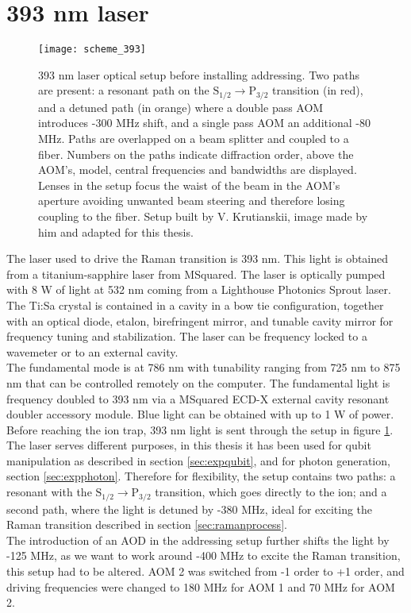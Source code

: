 \section{393 nm laser}
\label{sec:393setup}
\begin{figure}[!ht]
\centering
\texttt{[image: scheme\_393]}
\caption{393 nm laser optical setup before installing addressing. Two paths are present: a resonant path on the $\text{S}_{1/2} \to \text{P}_{3/2}$ transition (in red), and a detuned path (in orange) where a double pass AOM introduces -300 MHz shift, and a single pass AOM an additional -80 MHz. Paths are overlapped on a beam splitter and coupled to a fiber. Numbers on the paths indicate diffraction order, above the AOM's, model, central frequencies and bandwidths are displayed. Lenses in the setup focus the waist of the beam in the AOM's aperture avoiding unwanted beam steering and therefore losing coupling to the fiber. Setup built by V. Krutianskii, image made by him and adapted for this thesis.
}
\label{scheme393}
\end{figure}
The laser used to drive the Raman transition is 393 nm. This light is obtained from a titanium-sapphire laser from MSquared. The laser is optically pumped with 8 W of light at 532 nm coming from a Lighthouse Photonics Sprout laser. The Ti:Sa crystal is contained in a cavity in a bow tie configuration, together with an optical diode, etalon, birefringent mirror, and tunable cavity mirror for frequency tuning and stabilization. The laser can be frequency locked to a wavemeter or to an external cavity.\\ The fundamental mode is at 786 nm with tunability ranging from 725 nm to 875 nm that can be controlled remotely on the computer. The fundamental light is frequency doubled to 393 nm via a MSquared ECD-X external cavity resonant doubler accessory module. Blue light can be obtained with up to 1 W of power. Before reaching the ion trap, 393 nm light is sent through the setup in figure \ref{scheme393}. The laser serves different purposes, in this thesis it has been used for qubit manipulation as described in section \ref{sec:expqubit}, and for photon generation, section \ref{sec:expphoton}. Therefore for flexibility, the setup contains two paths: a resonant with the $\text{S}_{1/2} \to \text{P}_{3/2}$ transition, which goes directly to the ion; and a second path, where the light is detuned by -380 MHz, ideal for exciting the Raman transition described in section \ref{sec:ramanprocess}.\\
The introduction of an AOD in the addressing setup further shifts the light by -125 MHz, as we want to work around -400 MHz to excite the Raman transition,
this setup had to be altered. AOM 2 was switched from -1 order to +1 order, and driving frequencies were changed to 180 MHz for AOM 1 and 70 MHz for AOM 2.

